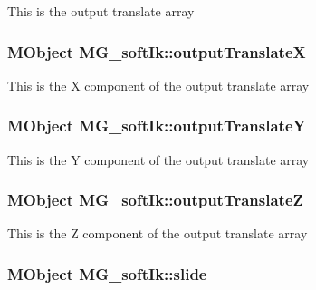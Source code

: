 This is the output translate array \hypertarget{class_m_g__soft_ik_afe844848e40644cf73613d0592c67d16}{
\subsubsection[{output\-Translate\-X}]{\setlength{\rightskip}{0pt plus 5cm}M\-Object M\-G\-\_\-soft\-Ik\-::output\-Translate\-X\hspace{0.3cm}{\ttfamily [static]}}}\label{class_m_g__soft_ik_afe844848e40644cf73613d0592c67d16}
This is the X component of the output translate array \hypertarget{class_m_g__soft_ik_a8e1a854c6ed650a85eb0ee282a0ff986}{
\subsubsection[{output\-Translate\-Y}]{\setlength{\rightskip}{0pt plus 5cm}M\-Object M\-G\-\_\-soft\-Ik\-::output\-Translate\-Y\hspace{0.3cm}{\ttfamily [static]}}}\label{class_m_g__soft_ik_a8e1a854c6ed650a85eb0ee282a0ff986}
This is the Y component of the output translate array \hypertarget{class_m_g__soft_ik_a81840d1c2a32bb9583990881fa327359}{
\subsubsection[{output\-Translate\-Z}]{\setlength{\rightskip}{0pt plus 5cm}M\-Object M\-G\-\_\-soft\-Ik\-::output\-Translate\-Z\hspace{0.3cm}{\ttfamily [static]}}}\label{class_m_g__soft_ik_a81840d1c2a32bb9583990881fa327359}
This is the Z component of the output translate array \hypertarget{class_m_g__soft_ik_aeb0fdd1e018c9a49d38f64856cf0ea6c}{
\subsubsection[{slide}]{\setlength{\rightskip}{0pt plus 5cm}M\-Object M\-G\-\_\-soft\-Ik\-::slide\hspace{0.3cm}{\ttfamily [static]}}}\label{class_m_g__soft_ik_aeb0fdd1e018c9a49d38f64856cf0ea6c}
